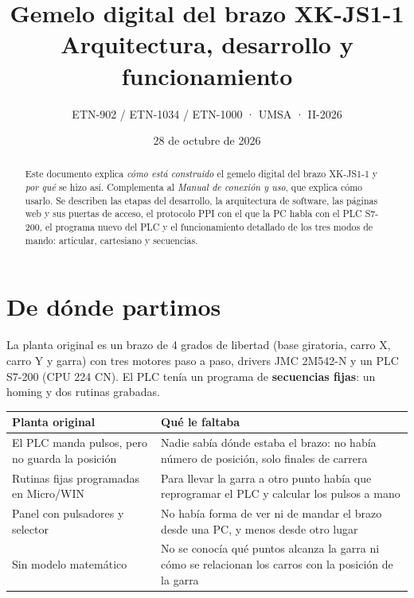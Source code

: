 \documentclass[a4paper,11pt]{article}
\title{\textbf{Gemelo digital del brazo XK-JS1-1}\\[4pt]\large Arquitectura, desarrollo y funcionamiento}
\author{ETN-902 / ETN-1034 / ETN-1000 · UMSA · II-2026}
\date{28 de octubre de 2026}
\begin{document}
\maketitle
\thispagestyle{fancy}

\begin{abstract}
Este documento explica \emph{cómo está construido} el gemelo digital del brazo XK-JS1-1 y \emph{por qué} se hizo así. Complementa al \emph{Manual de conexión y uso}, que explica cómo usarlo. Se describen las etapas del desarrollo, la arquitectura de software, las páginas web y sus puertas de acceso, el protocolo PPI con el que la PC habla con el PLC S7-200, el programa nuevo del PLC y el funcionamiento detallado de los tres modos de mando: articular, cartesiano y secuencias.
\end{abstract}

\tableofcontents
\newpage

\section{De dónde partimos}

La planta original es un brazo de 4 grados de libertad (base giratoria, carro X, carro Y y garra) con tres motores paso a paso, drivers JMC 2M542-N y un PLC S7-200 (CPU 224 CN). El PLC tenía un programa de \textbf{secuencias fijas}: un homing y dos rutinas grabadas.

\begin{center}\small
\begin{tabularx}{\linewidth}{>{\raggedright}p{4.6cm} >{\raggedright\arraybackslash}X}
\toprule
\textbf{Planta original} & \textbf{Qué le faltaba}\\
\midrule
El PLC manda pulsos, pero no guarda la posición & Nadie sabía dónde estaba el brazo: no había número de posición, solo finales de carrera\\
Rutinas fijas programadas en Micro/WIN & Para llevar la garra a otro punto había que reprogramar el PLC y calcular los pulsos a mano\\
Panel con pulsadores y selector & No había forma de ver ni de mandar el brazo desde una PC, y menos desde otro lugar\\
Sin modelo matemático & No se conocía qué puntos alcanza la garra ni cómo se relacionan los carros con la posición de la garra\\
\bottomrule
\end{tabularx}
\end{center}
\end{document}
